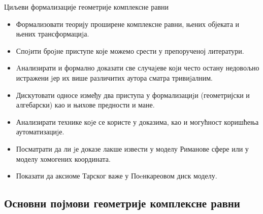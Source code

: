 \documentclass[slidestop, compress, mathserif, containsverbatim, xcolor=dvipsnames]{beamer}
\begin{document}
\begin{frame}[shrink]{Циљеви формализације геометрије комплексне равни}
  \begin{itemize}
  \item Формализовати теорију проширене комплексне равни, њених
    објеката и њених трансформациjа.
  \item Споjити броjне приступе које можемо срести у препорученој
    литератури.
  \item Aнализирати и формално доказати све случаjеве коjи често
    остану недовољно истражени jер их више различитих аутора сматра
    тривиjалним.
  \item Дискутовати односе између два приступа у формализациjи
    (геометријски и алгебарски) као и њихове предности и мане.
  \item Анализирати технике коjе се користе у доказима, као и
    могућност коришћења аутоматизациjе.
  \item Посматрати да ли jе доказе лакше извести у моделу Риманове
    сфере или у моделу хомогених координата.
  \item Показати да аксиоме Тарског важе у Поeнкареовом диск моделу.
  \end{itemize}
\end{frame}

\subsection*{Основни појмови геометрије комплексне равни}
\end{document}
